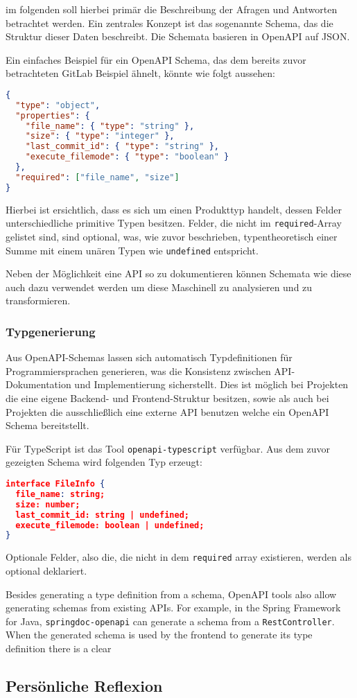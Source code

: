 im folgenden soll hierbei primär die Beschreibung der Afragen und Antworten betrachtet werden.
Ein zentrales Konzept ist das sogenannte Schema, das die Struktur dieser Daten beschreibt. 
Die Schemata basieren in OpenAPI auf JSON.

Ein einfaches Beispiel für ein OpenAPI Schema, das dem bereits zuvor betrachteten GitLab Beispiel ähnelt, könnte wie folgt aussehen:

\begin{lstlisting}[language=json]
{
  "type": "object",
  "properties": {
    "file_name": { "type": "string" },
    "size": { "type": "integer" },
    "last_commit_id": { "type": "string" },
    "execute_filemode": { "type": "boolean" }
  },
  "required": ["file_name", "size"]
}
\end{lstlisting}

Hierbei ist ersichtlich, dass es sich um einen Produkttyp handelt,
dessen Felder unterschiedliche primitive Typen besitzen.
Felder, die nicht im \texttt{required}-Array gelistet sind, sind optional, was, wie zuvor beschrieben,
typentheoretisch einer Summe mit einem unären Typen wie \texttt{undefined} entspricht.

Neben der Möglichkeit eine API so zu dokumentieren können Schemata wie diese auch dazu verwendet werden
um diese Maschinell zu analysieren und zu transformieren.

\subsubsection{Typgenerierung}

Aus OpenAPI-Schemas lassen sich automatisch Typdefinitionen für Programmiersprachen generieren, 
was die Konsistenz zwischen API-Dokumentation und Implementierung sicherstellt.
Dies ist möglich bei Projekten die eine eigene Backend- und Frontend-Struktur besitzen, sowie als auch
bei Projekten die ausschließlich eine externe API benutzen welche ein OpenAPI Schema bereitstellt.

Für TypeScript ist das Tool \texttt{openapi-typescript} verfügbar.
Aus dem zuvor gezeigten Schema wird folgenden Typ erzeugt:
\begin{lstlisting}[language=json]
interface FileInfo {
  file_name: string;
  size: number;
  last_commit_id: string | undefined;
  execute_filemode: boolean | undefined;
}
\end{lstlisting}
Optionale Felder, also die, die nicht in dem \texttt{required} array existieren, werden als optional deklariert.

Besides generating a type definition from a schema, OpenAPI tools also allow generating schemas from existing APIs.
For example, in the Spring Framework for Java, \texttt{springdoc-openapi} can generate a schema from a \texttt{RestController}.
When the generated schema is used by the frontend to generate its type definition there is a clear

\subsection{Persönliche Reflexion}
